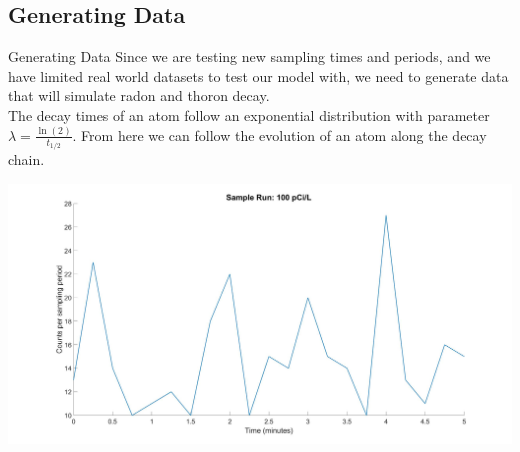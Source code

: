 \documentclass{beamer}
\begin{document}
\subsection{Generating Data}
\begin{frame}{Generating Data}
Since we are testing new sampling times and periods, and we have limited real world datasets to test our model with, we need to generate data that will simulate radon and thoron decay.\\
\vspace{0.2cm}
The decay times of an atom follow an exponential distribution with parameter $\lambda = \frac{\ln(2)}{t_{1/2}}$. From here we can follow the evolution of an atom along the decay chain.\\
\vspace{0.2cm}
\begin{center}
    \includegraphics[scale=0.085]{images/samplerun.jpg}
\end{center}
\end{frame}
\end{document}

